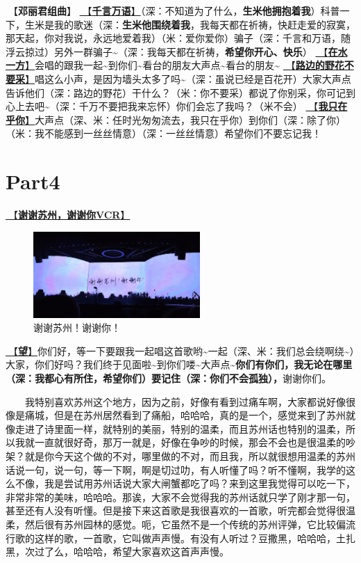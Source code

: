\documentclass[]{ctexbook}
\begin{document}
🎵【\textbf{邓丽君组曲}】
\hyperref[thousands-of-words]{🎵【\textbf{千言万语}】}（深：不知道为了什么，\textbf{生米他拥抱着我}）科普一下，生米是我的歌迷（深：\textbf{生米他围绕着我}，我每天都在祈祷，快赶走爱的寂寞，那天起，你对我说，永远地爱着我）（米：爱你爱你）骗子（深：千言和万语，随浮云掠过）另外一群骗子\textasciitilde（深：我每天都在祈祷，\textbf{希望你开心、快乐}）
\hyperref[on-the-water-side]{🎵【\textbf{在水一方}】}会唱的跟我一起\textasciitilde 到你们\textasciitilde 看台的朋友大声点\textasciitilde 看台的朋友\textasciitilde{}
\hyperref[only-with-me]{🎵【\textbf{路边的野花不要采}】}唱这么小声，是因为墙头太多了吗\textasciitilde（深：虽说已经是百花开）大家大声点告诉他们（深：路边的野花）干什么？（米：你不要采）都说了你别采，你可记到心上去吧\textasciitilde（深：千万不要把我来忘怀）你们会忘了我吗？（米不会）
\hyperref[only-you]{🎵【\textbf{我只在乎你}】}大声点（深、米：任时光匆匆流去，我只在乎你）到你们（深：除了你）（米：我不能感到一丝丝情意）（深：一丝丝情意）希望你们不要忘记我！

\section{Part4}\label{suzhou-20241109-part4}

\hyperref[thank-you-vcr]{🎥【\textbf{谢谢苏州，谢谢你VCR}】}

\begin{figure}

{\centering \includegraphics[width=180pt]{img/suzhou20241109/thank-suzhou} 

}

\caption{谢谢苏州！谢谢你！}\label{fig:unnamed-chunk-115}
\end{figure}

\hyperref[hope]{🎵【\textbf{望}】}你们好，等一下要跟我一起唱这首歌哟\textasciitilde 一起（深、米：我们总会绕啊绕\textasciitilde）大家，你们好吗？我们终于见面啦\textasciitilde 到你们喽\textasciitilde 大声点\textasciitilde{}\textbf{你们有你们，我无论在哪里（深：我都心有所住，希望你们）要记住（深：你们不会孤独），}谢谢你们。

  我特别喜欢苏州这个地方，因为之前，好像有看到过痛车啊，大家都说好像很像是痛城，但是在苏州居然看到了痛船，哈哈哈，真的是一个，感觉来到了苏州就像走进了诗里面一样，就特别的美丽，特别的温柔，而且苏州话也特别的温柔，所以我就一直就很好奇，那万一就是，好像在争吵的时候，那会不会也是很温柔的吵架？就是你今天这个做的不对，哪里做的不对，而且我，所以就很想用温柔的苏州话说一句，说一句，等一下啊，啊是切过叻，有人听懂了吗？听不懂啊，我学的这么不像，我是尝试用苏州话说大家大闸蟹都吃了吗？来到这里我觉得可以吃一下，非常非常的美味，哈哈哈。那诶，大家不会觉得我的苏州话就只学了刚才那一句，甚至还有人没有听懂。但是接下来这首歌是我很喜欢的一首歌，听完都会觉得很温柔，然后很有苏州园林的感觉。呃，它虽然不是一个传统的苏州评弹，它比较偏流行歌的这样的歌，一首歌，它叫做声声慢。有没有人听过？豆撒黑，哈哈哈，土扎黑，次过了么，哈哈哈，希望大家喜欢这首声声慢。
\end{document}
